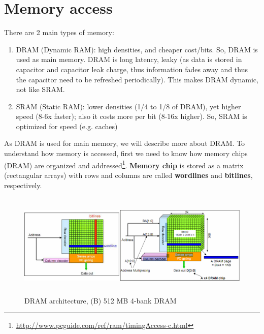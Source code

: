 \section{Memory access}
\label{sec:memory-access}

There are 2 main types of memory:
\begin{enumerate}
  \item DRAM (Dynamic RAM): high densities, and cheaper cost/bits. So, DRAM is
  used as main memory. DRAM is long latency, leaky (as data is stored in
  capacitor and capacitor leak charge, thus information fades away and thus
  the capacitor need to be refreshed periodically). This makes DRAM dynamic, not
  like SRAM. 
  \item SRAM (Static RAM): lower densities (1/4 to 1/8 of DRAM), yet higher
  speed (8-6x faster); also it costs more per bit (8-16x higher). So, SRAM is
  optimized for speed (e.g. caches)
\end{enumerate}

As DRAM is used for main memory, we will describe more about DRAM.
To understand how memory is accessed, first we need to know how memory
chips (DRAM) are
organized
and
addressed\footnote{\url{http://www.pcguide.com/ref/ram/timingAccess-c.html}}.
{\bf Memory chip} is stored as a matrix (rectangular arrays) with rows and
columns are called {\bf wordlines} and {\bf bitlines}, respectively.

\begin{figure}[hbt]
  \centerline{\includegraphics[height=5cm,
    angle=0]{./images/DRAM_architecture.eps}}
  \caption{DRAM architecture, (B) 512 MB 4-bank DRAM }
  \label{fig:DRAM}
\end{figure}

